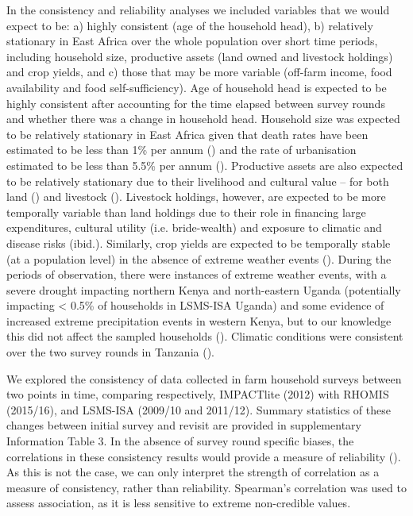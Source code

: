 In the consistency and reliability analyses we included variables that we would expect to be: a) highly consistent (age of the household head), b) relatively stationary in East Africa over the whole population over short time periods, including household size, productive assets (land owned and livestock holdings) and crop yields, and c) those that may be more variable (off-farm income, food availability and food self-sufficiency). Age of household head is expected to be highly consistent after accounting for the time elapsed between survey rounds and whether there was a change in household head. Household size was expected to be relatively stationary in East Africa given that death rates have been estimated to be less than 1\% per annum (\citealp{CIA2016a}) and the rate of urbanisation estimated to be less than 5.5\% per annum (\citealp{CIA2016}). Productive assets are also expected to be relatively stationary due to their livelihood and cultural value -- for both land (\citealp{Jayne2016}) and livestock (\citealp{Thornton2015}). Livestock holdings, however, are expected to be more temporally variable than land holdings due to their role in financing large expenditures, cultural utility (i.e. bride-wealth) and exposure to climatic and disease risks (ibid.). Similarly, crop yields are expected to be temporally stable (at a population level) in the absence of extreme weather events (\citealp{Gollin2006}). During the periods of observation, there were instances of extreme weather events, with a severe drought impacting northern Kenya and north-eastern Uganda (potentially impacting {\textless} 0.5\% of households in LSMS-ISA Uganda) and some evidence of increased extreme precipitation events in western Kenya, but to our knowledge this did not affect the sampled households (\citealp{Gebrechorkos2018}). Climatic conditions were consistent over the two survey rounds in Tanzania (\citealp{Fraval2018a}).

We explored the consistency of data collected in farm household surveys between two points in time, comparing respectively, IMPACTlite (2012) with RHOMIS (2015/16), and LSMS-ISA (2009/10 and 2011/12). Summary statistics of these changes between initial survey and revisit are provided in supplementary Information Table 3. In the absence of survey round specific biases, the correlations in these consistency results would provide a measure of reliability (\citealp{Alwin2006}). As this is not the case, we can only interpret the strength of correlation as a measure of consistency, rather than reliability. Spearman's correlation was used to assess association, as it is less sensitive to extreme non-credible values.

